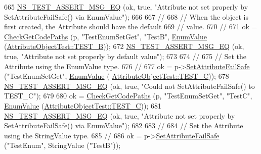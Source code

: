 \begin{DoxyCode}
665   \hyperlink{group__testing_ga2a9d78cffb3db8e867c35fff0b698cf5}{NS\_TEST\_ASSERT\_MSG\_EQ} (ok, \textcolor{keyword}{true}, \textcolor{stringliteral}{"Attribute not set properly by
       SetAttributeFailSafe() via EnumValue"});
666 
667   \textcolor{comment}{//}
668   \textcolor{comment}{// When the object is first created, the Attribute should have the default }
669   \textcolor{comment}{// value.}
670   \textcolor{comment}{//}
671   ok = \hyperlink{classAttributeTestCase_a902fb84c803f1c898329f9263575331e}{CheckGetCodePaths} (p, \textcolor{stringliteral}{"TestEnumSetGet"}, \textcolor{stringliteral}{"TestB"}, 
      \hyperlink{classns3_1_1EnumValue}{EnumValue} (\hyperlink{classAttributeObjectTest_a7d0dfe3f27ac6d9338a92781caf287cbacef47df5205983db654b3fc3cdb10865}{AttributeObjectTest::TEST\_B}));
672   \hyperlink{group__testing_ga2a9d78cffb3db8e867c35fff0b698cf5}{NS\_TEST\_ASSERT\_MSG\_EQ} (ok, \textcolor{keyword}{true}, \textcolor{stringliteral}{"Attribute not set properly by default value"});
673 
674   \textcolor{comment}{//}
675   \textcolor{comment}{// Set the Attribute using the EnumValue type.}
676   \textcolor{comment}{//}
677   ok = p->\hyperlink{classns3_1_1ObjectBase_aa7d333004e970f925a4ed5df275541b5}{SetAttributeFailSafe} (\textcolor{stringliteral}{"TestEnumSetGet"}, \hyperlink{classns3_1_1EnumValue}{EnumValue} (
      \hyperlink{classAttributeObjectTest_a7d0dfe3f27ac6d9338a92781caf287cba34f22f94dd4e890a10784749d81ea296}{AttributeObjectTest::TEST\_C}));
678   \hyperlink{group__testing_ga2a9d78cffb3db8e867c35fff0b698cf5}{NS\_TEST\_ASSERT\_MSG\_EQ} (ok, \textcolor{keyword}{true}, \textcolor{stringliteral}{"Could not SetAttributeFailSafe() to TEST\_C"});
679 
680   ok = \hyperlink{classAttributeTestCase_a902fb84c803f1c898329f9263575331e}{CheckGetCodePaths} (p, \textcolor{stringliteral}{"TestEnumSetGet"}, \textcolor{stringliteral}{"TestC"}, 
      \hyperlink{classns3_1_1EnumValue}{EnumValue} (\hyperlink{classAttributeObjectTest_a7d0dfe3f27ac6d9338a92781caf287cba34f22f94dd4e890a10784749d81ea296}{AttributeObjectTest::TEST\_C}));
681   \hyperlink{group__testing_ga2a9d78cffb3db8e867c35fff0b698cf5}{NS\_TEST\_ASSERT\_MSG\_EQ} (ok, \textcolor{keyword}{true}, \textcolor{stringliteral}{"Attribute not set properly by
       SetAttributeFailSafe() via EnumValue"});
682 
683   \textcolor{comment}{//}
684   \textcolor{comment}{// Set the Attribute using the StringValue type.}
685   \textcolor{comment}{//}
686   ok = p->\hyperlink{classns3_1_1ObjectBase_aa7d333004e970f925a4ed5df275541b5}{SetAttributeFailSafe} (\textcolor{stringliteral}{"TestEnum"}, StringValue (\textcolor{stringliteral}{"TestB"}));

\end{DoxyCode}
